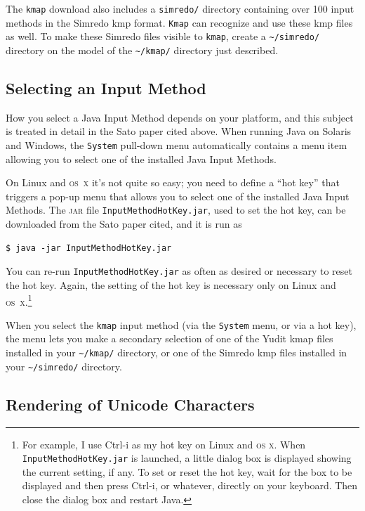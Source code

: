\documentclass[letterpaper,12pt]{article}
\newcommand{\acro}{\textsc}
\begin{document}
The \texttt{kmap} download also includes a \texttt{simredo/} directory containing
over 100 input methods in the Simredo kmp format.  \texttt{Kmap} can recognize and
use these kmp files as well.  To make these Simredo files visible to
\texttt{kmap}, create a \texttt{\~{}/simredo/} directory on the model of the
\texttt{\~{}/kmap/} directory just described.

\subsection{Selecting an Input Method}

How you select a Java Input Method depends on your platform, and this
subject is treated in detail in the Sato paper cited above.  When running
Java on Solaris and Windows, the \texttt{System} pull-down menu
automatically contains a menu item allowing you to select one of the
installed Java Input Methods.

On Linux and \acro{os~x} it's not quite so easy; 
you need to define a ``hot key'' that triggers a
pop-up menu that allows you to select one of the installed Java Input
Methods.  The \acro{jar} file \texttt{InputMethodHotKey.jar}, used
to set the hot key, can be
downloaded from the Sato paper cited, and it is run as

\begin{Verbatim}[fontsize=\small]
$ java -jar InputMethodHotKey.jar
\end{Verbatim}

\noindent
You can re-run \texttt{InputMethodHotKey.jar} as often as desired
or necessary to reset the hot key.
Again, the setting of the hot key is necessary only on Linux and
\acro{os~x}.\footnote{For example, I use Ctrl-i as my hot key on Linux
and \acro{os x}.  When \texttt{InputMethodHotKey.jar} is launched, a
little dialog box is displayed showing the current setting, if any.  To
set or reset the hot key, wait for the box to be displayed and then press
Ctrl-i, or whatever, directly on your keyboard. Then close the dialog box
and restart Java.}

When you select the \texttt{kmap} input method (via the \texttt{System}
menu, or via a hot key), the menu lets you make a secondary selection of
one of the Yudit kmap files installed in your \texttt{\~{}/kmap/}
directory, or one of the Simredo kmp files installed in your
\texttt{\~{}/simredo/} directory.

\subsection{Rendering of Unicode Characters}
\end{document}
